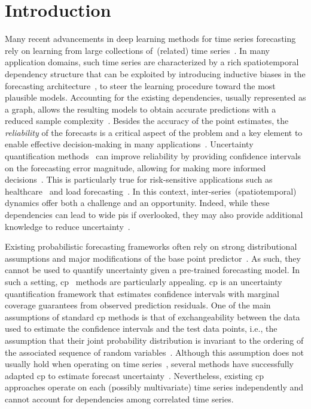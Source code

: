 \section{Introduction}\label{sec:intro}

Many recent advancements in deep learning methods for time series forecasting rely on learning from large collections of~(related) time series~\cite{benidis2022deep, liang2024foundation}. In many application domains, such time series are characterized by a rich spatiotemporal dependency structure that can be exploited by introducing inductive biases in the forecasting architecture~\cite{cini2023graphdeep}, to steer the learning procedure toward the most plausible models. Accounting for the existing dependencies, usually represented as a graph, allows the resulting models to obtain accurate predictions with a reduced sample complexity~\cite{jin2023survey, cini2023graphdeep}. Besides the accuracy of the point estimates, the \textit{reliability} of the forecasts is a critical aspect of the problem and a key element to enable effective decision-making in many applications~\cite{makridakis1996forecasting, petropoulos2022forecasting}.
Uncertainty quantification methods~\cite{smith2024uncertainty, vovk2005algorithmic} can improve reliability by providing confidence intervals on the forecasting error magnitude, allowing for making more informed decisions~\cite{hyndman2018forecasting}. This is particularly true for risk-sensitive applications such as healthcare~\cite{makridakis2019forecasting} and load forecasting~\cite{gasparin2022deep}. In this context, inter-series~(spatiotemporal) dynamics offer both a challenge and an opportunity. Indeed, while these dependencies can lead to wide \glspl{pi} if overlooked, they may also provide additional knowledge to reduce uncertainty~\cite{zambon2022aztest}.

Existing probabilistic forecasting frameworks often rely on strong distributional assumptions and major modifications of the base point predictor~\cite{benidis2022deep, salinas2020deepar}. As such, they cannot be used to quantify uncertainty given a pre-trained forecasting model. 
In such a setting, \gls{cp}~\cite{vovk2005algorithmic, angelopoulos2023conformal} methods are particularly appealing. \Gls{cp} is an uncertainty quantification framework that estimates confidence intervals with marginal coverage guarantees from observed prediction residuals. 
One of the main assumptions of standard \gls{cp} methods is that of exchangeability between the data used to estimate the confidence intervals and the test data points, i.e., the assumption that their joint probability distribution is invariant to the ordering of the associated sequence of random variables~\cite{angelopoulos2024theoretical}. Although this assumption does not usually hold when operating on time series~\cite{barber2023conformal}, several methods have successfully adapted \gls{cp} to estimate forecast uncertainty~\cite{stankeviciute2021conformal, xu2023conformal, xu2023sequential, jensen2022ensemble, auer2023conformal}. Nevertheless, existing \gls{cp} approaches operate on each (possibly multivariate) time series independently and cannot account for dependencies among correlated time series. 

